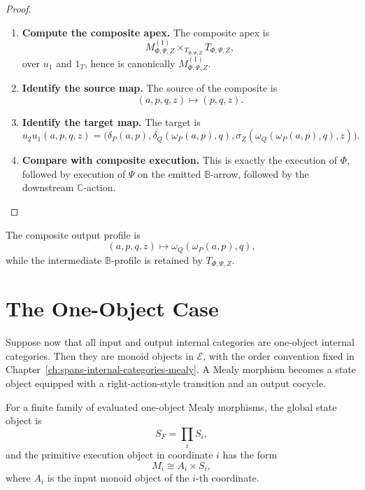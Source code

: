 \begin{proof}
    \leavevmode
    \begin{enumerate}
        \item \textbf{Compute the composite apex.}
        The composite apex is
        \[
            M^{(1)}_{\Phi,\Psi,Z}
            \times_{T_{\Phi,\Psi,Z}}
            T_{\Phi,\Psi,Z},
        \]
        over \(u_1\) and \(1_T\), hence is canonically
        \(M^{(1)}_{\Phi,\Psi,Z}\).

        \item \textbf{Identify the source map.}
        The source of the composite is
        \[
            (a,p,q,z)\longmapsto(p,q,z).
        \]

        \item \textbf{Identify the target map.}
        The target is
        \[
            u_2u_1(a,p,q,z)
            =
            \bigl(
                \delta_P(a,p),
                \delta_Q(\omega_P(a,p),q),
                \sigma_Z(\omega_Q(\omega_P(a,p),q),z)
            \bigr).
        \]

        \item \textbf{Compare with composite execution.}
        This is exactly the execution of \(\Phi\), followed by execution of
        \(\Psi\) on the emitted \(\mathbb B\)-arrow, followed by the
        downstream \(\mathbb C\)-action.
    \end{enumerate}
\end{proof}

The composite output profile is
\[
    (a,p,q,z)\longmapsto
    \omega_Q(\omega_P(a,p),q),
\]
while the intermediate \(\mathbb B\)-profile is retained by
\(T_{\Phi,\Psi,Z}\).

\section{The One-Object Case}
\label{sec:cmett-one-object-case}

Suppose now that all input and output internal categories are one-object
internal categories. Then they are monoid objects in \(\mathcal E\), with the
order convention fixed in Chapter~\ref{ch:spans-internal-categories-mealy}. A
Mealy morphism becomes a state object equipped with a right-action-style
transition and an output cocycle.

For a finite family of evaluated one-object Mealy morphisms, the global state
object is
\[
    S_F=\prod_iS_i,
\]
and the primitive execution object in coordinate \(i\) has the form
\[
    M_i\cong A_i\times S_i,
\]
where \(A_i\) is the input monoid object of the \(i\)-th coordinate.

